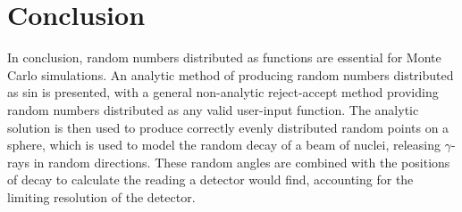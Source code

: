 \section{Conclusion}
\label{sec:conlusion}

In conclusion, random numbers distributed as functions are essential for Monte Carlo simulations. An analytic method of producing random numbers distributed as sin is presented, with a general non-analytic reject-accept method providing random numbers distributed as any valid user-input function. The analytic solution is then used to produce correctly evenly distributed random points on a sphere, which is used to model the random decay of a beam of nuclei, releasing $\gamma$-rays in random directions. These random angles are combined with the positions of decay to calculate the reading a detector would find, accounting for the limiting resolution of the detector.
